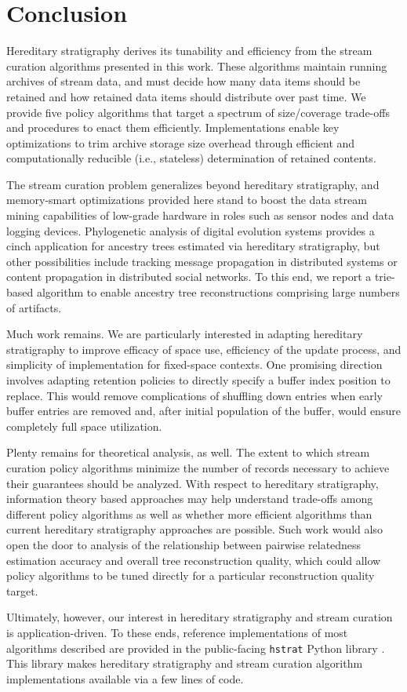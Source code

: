 \section{Conclusion} \label{sec:conclusion}

Hereditary stratigraphy derives its tunability and efficiency from the stream curation algorithms presented in this work.
These algorithms maintain running archives of stream data, and must decide how many data items should be retained and how retained data items should distribute over past time.
We provide five policy algorithms that target a spectrum of size/coverage trade-offs and procedures to enact them efficiently.
Implementations enable key optimizations to trim archive storage size overhead through efficient and computationally reducible (i.e., stateless) determination of retained contents.

The stream curation problem generalizes beyond hereditary stratigraphy, and memory-smart optimizations provided here stand to boost the data stream mining capabilities of low-grade hardware in roles such as sensor nodes and data logging devices.
Phylogenetic analysis of digital evolution systems provides a cinch application for ancestry trees estimated via hereditary stratigraphy, but other possibilities include tracking message propagation in distributed systems or content propagation in distributed social networks.
To this end, we report a trie-based algorithm to enable ancestry tree reconstructions comprising large numbers of artifacts.

Much work remains.
We are particularly interested in adapting hereditary stratigraphy to improve efficacy of space use, efficiency of the update process, and simplicity of implementation for fixed-space contexts.
One promising direction involves adapting retention policies to directly specify a buffer index position to replace.
This would remove complications of shuffling down entries when early buffer entries are removed and, after initial population of the buffer, would ensure completely full space utilization.

Plenty remains for theoretical analysis, as well.
The extent to which stream curation policy algorithms minimize the number of records necessary to achieve their guarantees should be analyzed.
With respect to hereditary stratigraphy, information theory based approaches may help understand trade-offs among different policy algorithms as well as whether more efficient algorithms than current hereditary stratigraphy approaches are possible.
Such work would also open the door to analysis of the relationship between pairwise relatedness estimation accuracy and overall tree reconstruction quality, which could allow policy algorithms to be tuned directly for a particular reconstruction quality target.

Ultimately, however, our interest in hereditary stratigraphy and stream curation is application-driven.
To these ends, reference implementations of most algorithms described are provided in the public-facing \texttt{hstrat} Python library \citep{moreno2022hstrat}.
This library makes hereditary stratigraphy and stream curation algorithm implementations available via a few lines of code.
